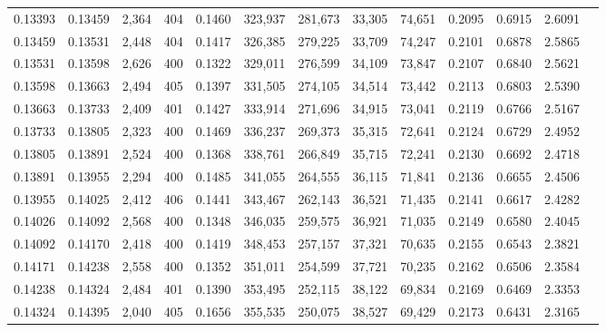 \begin{tabular}{rrrrrrrrrrrrr}
0.13393 & 0.13459 &  2,364 & 404 &                                     0.1460 & 323,937 & 281,673 &  33,305 &  74,651 & 0.2095 & 0.6915 & 2.6091 \\
0.13459 & 0.13531 &  2,448 & 404 &                                     0.1417 & 326,385 & 279,225 &  33,709 &  74,247 & 0.2101 & 0.6878 & 2.5865 \\
0.13531 & 0.13598 &  2,626 & 400 &                                     0.1322 & 329,011 & 276,599 &  34,109 &  73,847 & 0.2107 & 0.6840 & 2.5621 \\
0.13598 & 0.13663 &  2,494 & 405 &                                     0.1397 & 331,505 & 274,105 &  34,514 &  73,442 & 0.2113 & 0.6803 & 2.5390 \\
0.13663 & 0.13733 &  2,409 & 401 &                                     0.1427 & 333,914 & 271,696 &  34,915 &  73,041 & 0.2119 & 0.6766 & 2.5167 \\
0.13733 & 0.13805 &  2,323 & 400 &                                     0.1469 & 336,237 & 269,373 &  35,315 &  72,641 & 0.2124 & 0.6729 & 2.4952 \\
0.13805 & 0.13891 &  2,524 & 400 &                                     0.1368 & 338,761 & 266,849 &  35,715 &  72,241 & 0.2130 & 0.6692 & 2.4718 \\
0.13891 & 0.13955 &  2,294 & 400 &                                     0.1485 & 341,055 & 264,555 &  36,115 &  71,841 & 0.2136 & 0.6655 & 2.4506 \\
0.13955 & 0.14025 &  2,412 & 406 &                                     0.1441 & 343,467 & 262,143 &  36,521 &  71,435 & 0.2141 & 0.6617 & 2.4282 \\
0.14026 & 0.14092 &  2,568 & 400 &                                     0.1348 & 346,035 & 259,575 &  36,921 &  71,035 & 0.2149 & 0.6580 & 2.4045 \\
0.14092 & 0.14170 &  2,418 & 400 &                                     0.1419 & 348,453 & 257,157 &  37,321 &  70,635 & 0.2155 & 0.6543 & 2.3821 \\
0.14171 & 0.14238 &  2,558 & 400 &                                     0.1352 & 351,011 & 254,599 &  37,721 &  70,235 & 0.2162 & 0.6506 & 2.3584 \\
0.14238 & 0.14324 &  2,484 & 401 &                                     0.1390 & 353,495 & 252,115 &  38,122 &  69,834 & 0.2169 & 0.6469 & 2.3353 \\
0.14324 & 0.14395 &  2,040 & 405 &                                     0.1656 & 355,535 & 250,075 &  38,527 &  69,429 & 0.2173 & 0.6431 & 2.3165 \\

\end{tabular}
